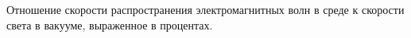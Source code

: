 Отношение скорости распространения 
электромагнитных волн в среде к 
скорости света в вакууме, выраженное в процентах.